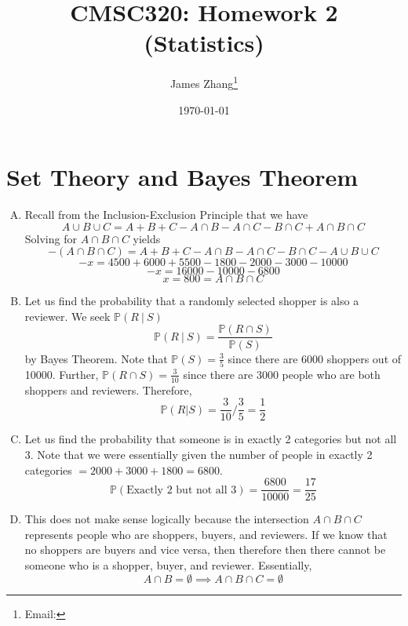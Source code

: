 \documentclass[12pt]{scrartcl}
\newcommand{\PP}{\mathbb{P}}
\begin{document}
\title{CMSC320: Homework 2 (Statistics)}
\author{James Zhang\thanks{Email: }}
\date{\today}



\maketitle

\section{Set Theory and Bayes Theorem}

\begin{enumerate}[A.]

  \item Recall from the Inclusion-Exclusion Principle that we have 
  \[A \cup B \cup C = A + B + C - A \cap B - A \cap C - B \cap C + A \cap B \cap C\]
  Solving for $A \cap B \cap C$ yields
  \[-(A \cap B \cap C) = A + B + C - A \cap B - A \cap C - B \cap C - A \cup B \cup C\]
  \[-x = 4500 + 6000 + 5500 - 1800 - 2000 - 3000 - 10000\]
  \[-x = 16000 - 10000 - 6800\]
  \[x = 800 = A \cap B \cap C\]

  \item Let us find the probability that a randomly selected shopper is also a reviewer.
  We seek $\PP(R \ | \ S)$
  \[\PP(R \ | \ S) = \frac{\PP(R \cap S)}{\PP(S)}\]
  by Bayes Theorem. Note that $\PP(S) = \frac{3}{5}$ since there are 6000 shoppers out of 10000.
  Further, $\PP(R \cap S) = \frac{3}{10}$ since there are 3000 people who are both shoppers and reviewers. 
  Therefore, 
  \[\PP(R | S) = \frac{3}{10} / \frac{3}{5} = \frac{1}{2}\]

  \item Let us find the probability that someone is in exactly 2 categories but not all 3. 
  Note that we were essentially given the number of people in exactly 2 categories $ = 2000 + 3000 + 1800 = 6800$.
  \[\PP(\text{Exactly 2 but not all 3}) = \frac{6800}{10000} = \frac{17}{25}\]

  \item This does not make sense logically because the intersection $A \cap B \cap C$ represents people 
  who are shoppers, buyers, and reviewers. If we know that no shoppers are buyers and vice versa, then therefore 
  then there cannot be someone who is a shopper, buyer, and reviewer. Essentially, 
  \[A \cap B = \emptyset \implies A \cap B \cap C = \emptyset\]
\end{enumerate}
\end{document}

